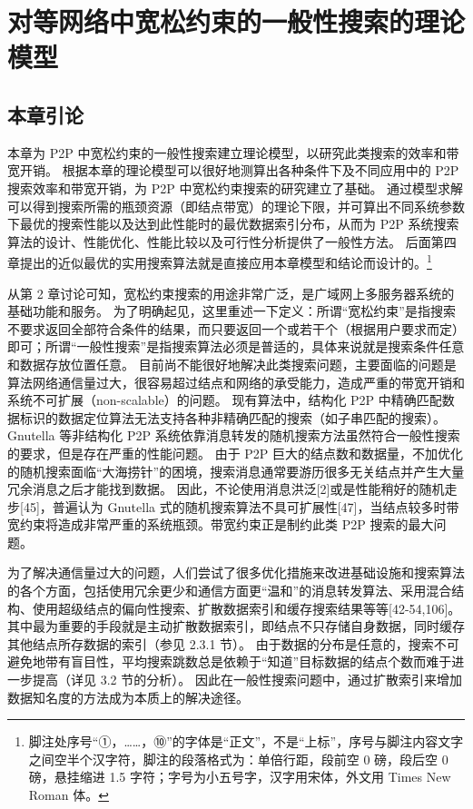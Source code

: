 \documentclass[degree=doctor]{thuthesis}
\begin{document}
\START
\showoutput

\mainmatter

\setcounter{chapter}{2}
\chapter{对等网络中宽松约束的一般性搜索的理论模型}

\section{本章引论}

本章为 P2P 中宽松约束的一般性搜索建立理论模型，以研究此类搜索的效率和带宽开销。
根据本章的理论模型可以很好地测算出各种条件下及不同应用中的 P2P 搜索效率和带宽开销，为 P2P 中宽松约束搜索的研究建立了基础。
通过模型求解可以得到搜索所需的瓶颈资源（即结点带宽）的理论下限，并可算出不同系统参数下最优的搜索性能以及达到此性能时的最优数据索引分布，从而为 P2P 系统搜索算法的设计、性能优化、性能比较以及可行性分析提供了一般性方法。
后面第四章提出的近似最优的实用搜索算法就是直接应用本章模型和结论而设计的。\footnote{%
  脚注处序号“①，……，⑩”的字体是“正文”，不是“上标”，序号与脚注内容文字之间空半个汉字符，脚注的段落格式为：单倍行距，段前空 0 磅，段后空 0 磅，悬挂缩进 1.5 字符；字号为小五号字，汉字用宋体，外文用 Times New Roman 体。
}

从第 2 章讨论可知，宽松约束搜索的用途非常广泛，是广域网上多服务器系统的基础功能和服务。
为了明确起见，这里重述一下定义：所谓“宽松约束”是指搜索不要求返回全部符合条件的结果，而只要返回一个或若干个（根据用户要求而定）即可；所谓“一般性搜索”是指搜索算法必须是普适的，具体来说就是搜索条件任意和数据存放位置任意。
目前尚不能很好地解决此类搜索问题，主要面临的问题是算法网络通信量过大，很容易超过结点和网络的承受能力，造成严重的带宽开销和系统不可扩展（non-scalable）的问题。
现有算法中，结构化 P2P 中精确匹配数据标识的数据定位算法无法支持各种非精确匹配的搜索（如子串匹配的搜索）。
Gnutella 等非结构化 P2P 系统依靠消息转发的随机搜索方法虽然符合一般性搜索的要求，但是存在严重的性能问题。
由于 P2P 巨大的结点数和数据量，不加优化的随机搜索面临“大海捞针”的困境，搜索消息通常要游历很多无关结点并产生大量冗余消息之后才能找到数据。
因此，不论使用消息洪泛[2]或是性能稍好的随机走步[45]，普遍认为 Gnutella 式的随机搜索算法不具可扩展性[47]，当结点较多时带宽约束将造成非常严重的系统瓶颈。带宽约束正是制约此类 P2P 搜索的最大问题。

为了解决通信量过大的问题，人们尝试了很多优化措施来改进基础设施和搜索算法的各个方面，包括使用冗余更少和通信方面更“温和”的消息转发算法、采用混合结构、使用超级结点的偏向性搜索、扩散数据索引和缓存搜索结果等等[42-54,106]。
其中最为重要的手段就是主动扩散数据索引，即结点不只存储自身数据，同时缓存其他结点所存数据的索引（参见 2.3.1 节）。
由于数据的分布是任意的，搜索不可避免地带有盲目性，平均搜索跳数总是依赖于“知道”目标数据的结点个数而难于进一步提高（详见 3.2 节的分析）。
因此在一般性搜索问题中，通过扩散索引来增加数据知名度的方法成为本质上的解决途径。
\end{document}
